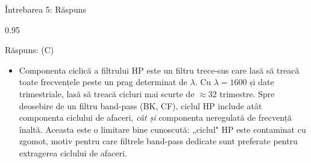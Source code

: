 \documentclass[9pt, aspectratio=169, t]{beamer}
\begin{document}
\begin{frame}{Întrebarea 5: Răspuns}
    \begin{cminipage}{0.95\textwidth}
    \vspace{-0.3cm}
    {\small
    \begin{exampleblock}{Răspuns: (C)}
    \begin{itemize}\setlength{\itemsep}{0pt}
        \item Componenta ciclică a filtrului HP este un filtru trece-sus care lasă să treacă toate frecvențele peste un prag determinat de $\lambda$. Cu $\lambda = 1600$ și date trimestriale, lasă să treacă cicluri mai scurte de $\approx 32$ trimestre. Spre deosebire de un filtru band-pass (BK, CF), ciclul HP include atât componenta ciclului de afaceri, \textit{cât și} componenta neregulată de frecvență înaltă. Aceasta este o limitare bine cunoscută: „ciclul" HP este contaminat cu zgomot, motiv pentru care filtrele band-pass dedicate sunt preferate pentru extragerea ciclului de afaceri.
    \end{itemize}
    \end{exampleblock}
    }
    \hfill{}
    \end{cminipage}
\end{frame}
\end{document}
